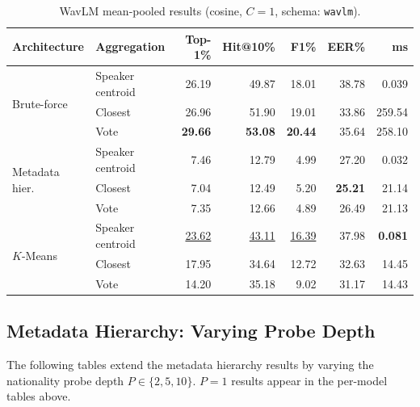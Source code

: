 \documentclass[12pt, a4paper]{article}
\newcommand{\code}[1]{\texttt{#1}}
\begin{document}
\begin{table}[H]
\centering
\caption{WavLM mean-pooled results (cosine, $C{=}1$, schema: \code{wavlm}).}
\label{tab:results_wavlm}
\setlength{\tabcolsep}{4pt}
\begin{tabular}{llrrrrr}
\toprule
\textbf{Architecture} & \textbf{Aggregation} &
\textbf{Top-1\%} & \textbf{Hit@10\%} &
\textbf{F1\%} & \textbf{EER\%} & \textbf{ms} \\
\midrule
\multirow{3}{*}{Brute-force}
  & Speaker centroid & 26.19 & 49.87 & 18.01 & 38.78 & 0.039 \\
  & Closest          & 26.96 & 51.90 & 19.01 & 33.86 & 259.54 \\
  & Vote             & \textbf{29.66} & \textbf{53.08} & \textbf{20.44} & 35.64 & 258.10 \\
\midrule
\multirow{3}{*}{Metadata hier.}
  & Speaker centroid & 7.46 & 12.79 & 4.99 & 27.20 & 0.032 \\
  & Closest          & 7.04 & 12.49 & 5.20 & \textbf{25.21} & 21.14 \\
  & Vote             & 7.35 & 12.66 & 4.89 & 26.49 & 21.13 \\
\midrule
\multirow{3}{*}{$K$-Means}
  & Speaker centroid & \underline{23.62} & \underline{43.11} & \underline{16.39} & 37.98 & \textbf{0.081} \\
  & Closest          & 17.95 & 34.64 & 12.72 & 32.63 & 14.45 \\
  & Vote             & 14.20 & 35.18 & 9.02 & 31.17 & 14.43 \\
\bottomrule
\end{tabular}
\end{table}

\subsection{Metadata Hierarchy: Varying Probe Depth}
\label{sec:results_probes}

The following tables extend the metadata hierarchy results by varying
the nationality probe depth $P \in \{2, 5, 10\}$.
$P{=}1$ results appear in the per-model tables above.
\end{document}
